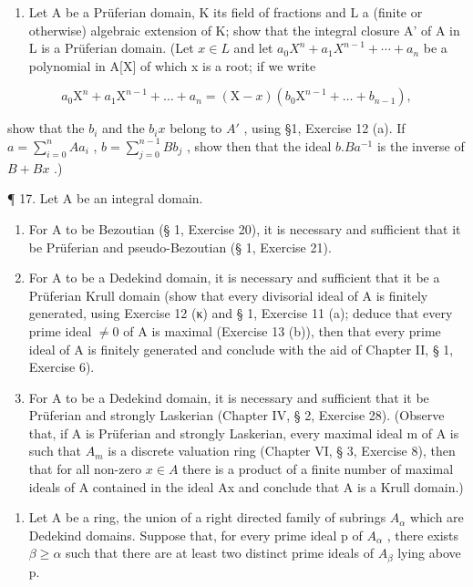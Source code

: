 \begin{enumerate}
\def\labelenumi{\arabic{enumi}.}
\setcounter{enumi}{15}
\tightlist
\item
  Let A be a Prüferian domain, K its field of fractions and L a (finite or otherwise) algebraic extension of K; show that the integral closure A' of A in L is a Prüferian domain. (Let \(x \in L\) and let \(a_{0}X^{n} + a_{1}X^{n-1} + \cdots + a_{n}\) be a polynomial in A{[}X{]} of which x is a root; if we write
\end{enumerate}

\[
a _ {0} \mathrm{X} ^ {n} + a _ {1} \mathrm{X} ^ {n - 1} + \dots + a _ {n} = (\mathrm{X} - x) (b _ {0} \mathrm{X} ^ {n - 1} + \dots + b _ {n - 1}),
\]

show that the \(b_{i}\) and the \(b_{i}x\) belong to \(A'\) , using §1, Exercise 12 (a). If \(a = \sum_{i=0}^{n} A a_{i}\) , \(b = \sum_{j=0}^{n-1} B b_{j}\) , show then that the ideal \(b.B a^{-1}\) is the inverse of \(B + B x\) .)

¶ 17. Let A be an integral domain.

\begin{enumerate}
\def\labelenumi{(\alph{enumi})}
\item
  For A to be Bezoutian (§ 1, Exercise 20), it is necessary and sufficient that it be Prüferian and pseudo-Bezoutian (§ 1, Exercise 21).
\item
  For A to be a Dedekind domain, it is necessary and sufficient that it be a Prüferian Krull domain (show that every divisorial ideal of A is finitely generated, using Exercise 12 (κ) and § 1, Exercise 11 (a); deduce that every prime ideal \(\neq 0\) of A is maximal (Exercise 13 (b)), then that every prime ideal of A is finitely generated and conclude with the aid of Chapter II, § 1, Exercise 6).
\item
  For A to be a Dedekind domain, it is necessary and sufficient that it be Prüferian and strongly Laskerian (Chapter IV, § 2, Exercise 28). (Observe that, if A is Prüferian and strongly Laskerian, every maximal ideal m of A is such that \(A_{m}\) is a discrete valuation ring (Chapter VI, § 3, Exercise 8), then that for all non-zero \(x \in A\) there is a product of a finite number of maximal ideals of A contained in the ideal Ax and conclude that A is a Krull domain.)
\end{enumerate}

\begin{enumerate}
\def\labelenumi{\arabic{enumi}.}
\setcounter{enumi}{17}
\tightlist
\item
  Let A be a ring, the union of a right directed family of subrings \(A_{\alpha}\) which are Dedekind domains. Suppose that, for every prime ideal p of \(A_{\alpha}\) , there exists \(\beta \geqslant \alpha\) such that there are at least two distinct prime ideals of \(A_{\beta}\) lying above p.
\end{enumerate}

